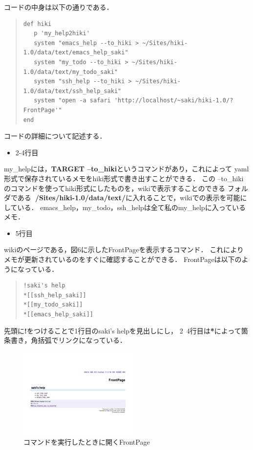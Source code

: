 コードの中身は以下の通りである．
\begin{quote}\begin{verbatim}
def hiki
   p 'my_help2hiki'
   system "emacs_help --to_hiki > ~/Sites/hiki-1.0/data/text/emacs_help_saki"
   system "my_todo --to_hiki > ~/Sites/hiki-1.0/data/text/my_todo_saki"
   system "ssh_help --to_hiki > ~/Sites/hiki-1.0/data/text/ssh_help_saki"
   system "open -a safari 'http://localhost/~saki/hiki-1.0/?FrontPage'"
end
\end{verbatim}\end{quote}
\newpage
コードの詳細について記述する．
\begin{itemize}
\item 2-4行目
\end{itemize}
\begin{description}
\item my\_helpには，\textbf{TARGET --to\_hiki}というコマンドがあり，これによって
yaml形式で保存されているメモをhiki形式で書き出すことができる．
この --to\_hiki のコマンドを使ってhiki形式にしたものを，wikiで表示することのできる
フォルダである\textbf{~/Sites/hiki-1.0/data/text/}に入れることで，wikiでの表示を可能にしている．
emacs\_help，my\_todo，ssh\_helpは全て私のmy\_helpに入っているメモ．
\end{description}

\begin{itemize}
\item 5行目
\end{itemize}
\begin{description}
\item wikiのページである，図6に示したFrontPageを表示するコマンド．
これによりメモが更新されているのをすぐに確認することができる．
FrontPageは以下のようになっている．
\end{description}
\begin{quote}\begin{verbatim}
!saki's help
*[[ssh_help_saki]]
*[[my_todo_saki]]
*[[emacs_help_saki]]
\end{verbatim}\end{quote}
\begin{description}
\item 先頭に\textbf{!}をつけることで1行目のsaki's helpを見出しにし，
2~4行目は\textbf{*}によって箇条書き，角括弧でリンクになっている．
\end{description}

\begin{figure}[htbp]\begin{center}
\includegraphics[clip,width=6cm,bb=100 100 600 550]{my_help2hiki_saki.002.png}
\caption{コマンドを実行したときに開くFrontPage }
\label{default}\end{center}\end{figure}

